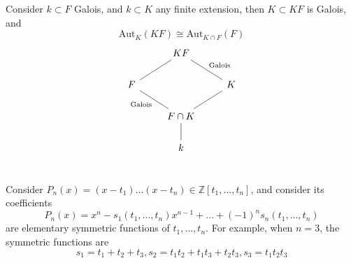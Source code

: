 \documentclass[openany]{book}
\newcommand{\Z}{\mathbb{Z}}
\newcommand{\aut}{\text{Aut}}
\begin{document}
\begin{prop}
    Consider $k\subset F$ Galois, and $k\subset K$ any finite extension, then $K\subset KF$ is Galois, and 
    \begin{equation*}
        \aut_{K}(KF)\cong\aut_{K\cap F}(F)
    \end{equation*}
    \[\begin{tikzcd}
        & KF \\
        F && K \\
        & {F\cap K} \\
        & k
        \arrow[no head, from=2-1, to=1-2]
        \arrow["{\text{Galois}}"', no head, from=2-3, to=1-2]
        \arrow["{\text{Galois}}", no head, from=3-2, to=2-1]
        \arrow[no head, from=3-2, to=2-3]
        \arrow[no head, from=4-2, to=3-2]
    \end{tikzcd}\]
\end{prop}




























\section{}

\begin{defn}
    Consider $P_n(x)=(x-t_1)\dots(x-t_n)\in\Z[t_1,\dots,t_n]$, and consider its coefficients
    \begin{equation*}
        P_n(x)=x^n-s_1(t_1, \dots, t_n)x^{n-1}+\dots+(-1)^{n}s_n(t_1,\dots, t_n)
    \end{equation*}
    are elementary symmetric functions of $t_1,\dots, t_n$. For example, when $n=3$, the symmetric functions are 
    \begin{equation*}
        s_1=t_1+t_2+t_3, s_2=t_1t_2+t_1t_3+t_2t_3, s_3=t_1t_2t_3
    \end{equation*}
\end{defn}
\end{document}
